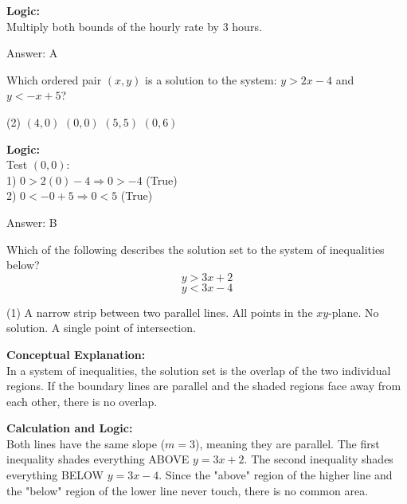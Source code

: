 \documentclass[11pt,paper=a4,answers]{exam}
\begin{document}
\begin{questions}
\begin{solution}
\textbf{Logic:} \\
Multiply both bounds of the hourly rate by 3 hours.

\vspace{15pt}
Answer: \colorbox{yellow!100}{A}
\end{solution}

\question
Which ordered pair $(x, y)$ is a solution to the system: $y > 2x - 4$ and $y < -x + 5$?
\begin{tasks}(2)
    \task $(4, 0)$
    \task $(0, 0)$
    \task $(5, 5)$
    \task $(0, 6)$
\end{tasks}

\begin{solution}
\textbf{Logic:} \\
Test $(0, 0)$: \\
1) $0 > 2(0) - 4 \Rightarrow 0 > -4$ (True) \\
2) $0 < -0 + 5 \Rightarrow 0 < 5$ (True)

\vspace{15pt}
Answer: \colorbox{yellow!100}{B}
\end{solution}

\question
Which of the following describes the solution set to the system of inequalities below?
\[ y > 3x + 2 \]
\[ y < 3x - 4 \]
\begin{tasks}(1)
    \task A narrow strip between two parallel lines.
    \task All points in the $xy$-plane.
    \task No solution.
    \task A single point of intersection.
\end{tasks}

\begin{solution}
\textbf{Conceptual Explanation:} \\
In a system of inequalities, the solution set is the overlap of the two individual regions. If the boundary lines are parallel and the shaded regions face away from each other, there is no overlap.

\vspace{10pt}
\textbf{Calculation and Logic:} \\
Both lines have the same slope ($m=3$), meaning they are parallel. 
The first inequality shades everything ABOVE $y = 3x + 2$. 
The second inequality shades everything BELOW $y = 3x - 4$. 
Since the "above" region of the higher line and the "below" region of the lower line never touch, there is no common area.


\end{solution}
\end{questions}
\end{document}
